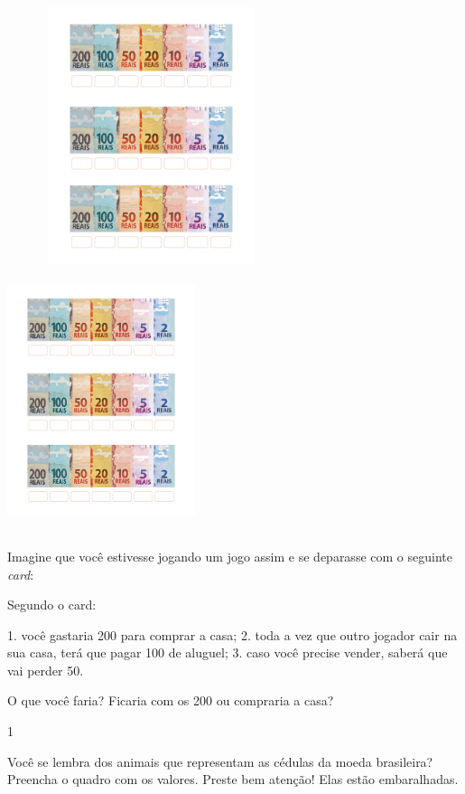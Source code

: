{{{{{{{{{\includegraphics[width=3.33025in,height=2.95560in]{media/image68.png}\includegraphics[width=2.16667in,height=3.03125in]{media/image69.png}

Imagine que você estivesse jogando um jogo assim e se deparasse com o seguinte
\emph{card}:

Segundo o card:

1. você gastaria 200 para comprar a casa;
2. toda a vez que outro jogador cair na sua casa, terá que pagar 100 de aluguel;
3. caso você precise vender, saberá que vai
perder 50. 

O que você faria? Ficaria com os 200 ou compraria a casa?



\num{1}

Você se lembra dos animais que representam as cédulas da moeda
brasileira? Preencha o quadro com os valores. Preste bem atenção!
Elas estão embaralhadas.

}}}}}}}}}
